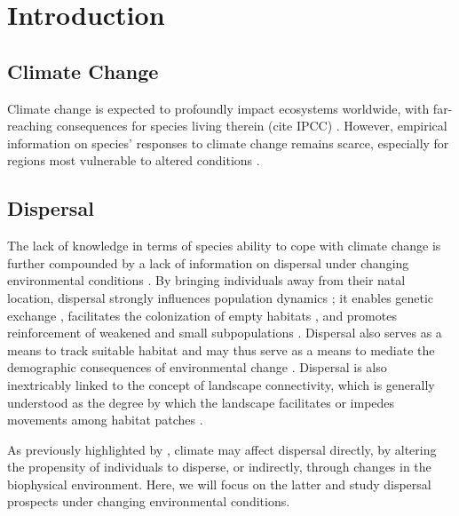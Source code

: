 \documentclass[abstract=on,10pt,a4paper,bibliography=totocnumbered]{article}
\begin{document}
\onehalfspacing
\tableofcontents
\doublespacing

\newpage
{}


\section{Introduction}
\subsection{Climate Change}
Climate change is expected to profoundly impact ecosystems worldwide, with
far-reaching consequences for species living therein (cite IPCC)
\citep{Ozgul.2010, Radchuk.2019}. However, empirical information on species' responses to climate change remains
scarce, especially for regions most vulnerable to altered conditions
\citep{Paniw.2021}.




\subsection{Dispersal}
The lack of knowledge in terms of species ability to cope with climate change is
further compounded by a lack of information on dispersal under changing
environmental conditions \citep{Travis.2013}. By bringing individuals away from
their natal location, dispersal strongly influences population dynamics
\citep{Clobert.2012}; it enables genetic exchange \citep{Frankham.2002,
Leigh.2012, Baguette.2013}, facilitates the colonization of empty habitats
\citep{Gustafson.1996, Hanski.1999b, MacArthur.2001}, and promotes reinforcement
of weakened and small subpopulations \citep{Brown.1977}. Dispersal also serves
as a means to track suitable habitat \citep{Raia.2012} and may thus serve as a
means to mediate the demographic consequences of environmental change
\citep{Hodgson.2009, Travis.2013}. Dispersal is also inextricably linked to the
concept of landscape connectivity, which is generally understood as the degree
by which the landscape facilitates or impedes movements among habitat patches
\citep{Tylor.1993}.

As previously highlighted by \cite{Travis.2013}, climate may affect dispersal
directly, by altering the propensity of individuals to disperse, or indirectly,
through changes in the biophysical environment. Here, we will focus on the
latter and study dispersal prospects under changing environmental conditions.
\end{document}
